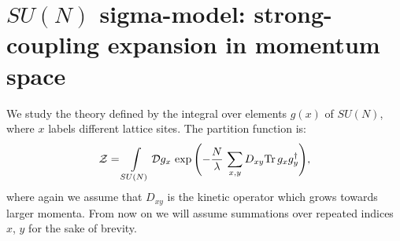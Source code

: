 \documentclass[twocolumn,showpacs,preprintnumbers,superscriptaddress,amsmath,floatfix,amssymb,secnumarabic]{revtex4}
\newcommand{\lr}[1]{ \left( #1 \right) }
\newcommand{\tr}{ {\rm Tr} \, }
\newcommand{\expa}[1]{ \exp{\left( #1 \right)} }
\begin{document}
\section*{$SU\lr{N}$ sigma-model: strong-coupling expansion in momentum space}
\label{sec:introduction}

 We study the theory defined by the integral over elements $g\lr{x}$ of $SU\lr{N}$, where $x$ labels different lattice sites. The partition function is:
\begin{eqnarray}
\label{pf_def}
\mathcal{Z} = \int\limits_{SU\lr{N}} \mathcal{D} g_x \,
\expa{-\frac{N}{\lambda}\, \sum \limits_{x,y} D_{xy} \tr g_x g^{\dag}_y } ,
\end{eqnarray}
where again we assume that $D_{xy}$ is the kinetic operator which grows towards larger momenta. From now on we will assume summations over repeated indices $x$, $y$ for the sake of brevity.
\end{document}
